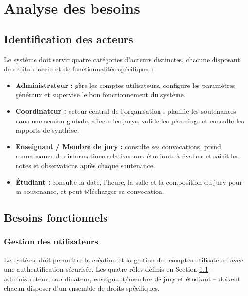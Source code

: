 \documentclass[12pt,a4paper]{article}
\begin{document}
\section{Analyse des besoins}
\label{sec:besoins}

\subsection{Identification des acteurs}
\label{subsec:acteurs}

Le système doit servir quatre catégories d'acteurs distinctes, chacune disposant
de droits d'accès et de fonctionnalités spécifiques :

\begin{itemize}[label=\textcolor{primary}{\textbullet}]
    \item \textbf{Administrateur :} gère les comptes utilisateurs, configure les
          paramètres généraux et supervise le bon fonctionnement du système.
    \item \textbf{Coordinateur :} acteur central de l'organisation ; planifie
          les soutenances dans une session globale, affecte les jurys, valide
          les plannings et consulte les rapports de synthèse.
    \item \textbf{Enseignant / Membre de jury :} consulte ses convocations,
          prend connaissance des informations relatives aux étudiants à évaluer
          et saisit les notes et observations après chaque soutenance.
    \item \textbf{Étudiant :} consulte la date, l'heure, la salle et la
          composition du jury pour sa soutenance, et peut télécharger sa
          convocation.
\end{itemize}

\subsection{Besoins fonctionnels}
\label{subsec:besoins_fonctionnels}

\subsubsection{Gestion des utilisateurs}
\label{subsubsec:gestion_utilisateurs}

Le système doit permettre la création et la gestion des comptes utilisateurs
avec une authentification sécurisée. Les quatre rôles définis en Section
\ref{subsec:acteurs} -- administrateur, coordinateur, enseignant/membre de jury
et étudiant -- doivent chacun disposer d'un ensemble de droits spécifiques.
\end{document}
